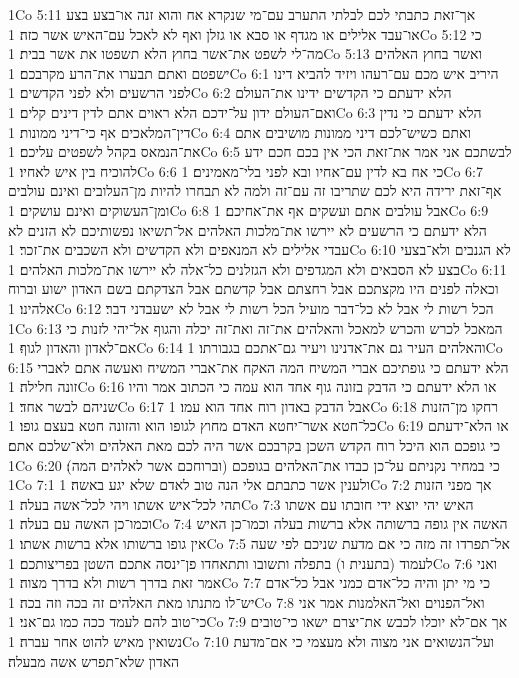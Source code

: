1Co 5:11  אך־זאת כתבתי לכם לבלתי התערב עם־מי שנקרא אח והוא זנה או־בצע בצע או־עבד אלילים או מגדף או סבא או גזלן ואף לא לאכל עם־האיש אשר כזה׃
1Co 5:12  כי מה־לי לשפט את־אשר בחוץ הלא תשפטו את אשר בבית׃
1Co 5:13  ואשר בחוץ האלהים ישפטם ואתם תבערו את־הרע מקרבכם׃
1Co 6:1  היריב איש מכם עם־רעהו ויזיד להביא דינו לפני הרשעים ולא לפני הקדשים׃
1Co 6:2  הלא ידעתם כי הקדשים ידינו את־העולם ואם־העולם ידון על־ידכם הלא ראוים אתם לדין דינים קלים׃
1Co 6:3  הלא ידעתם כי נדין דין־המלאכים אף כי־דיני ממונות׃
1Co 6:4  ואתם כשיש־לכם דיני ממונות מושיבים אתם את־הנמאס בקהל לשפטים עליכם׃
1Co 6:5  לבשתכם אני אמר את־זאת הכי אין בכם חכם ידע להוכיח בין איש לאחיו׃
1Co 6:6  כי אח בא לדין עם־אחיו ובא לפני בלי־מאמינים׃
1Co 6:7  אף־זאת ירידה היא לכם שתריבו זה עם־זה ולמה לא תבחרו להיות מן־העלובים ואינם עולבים ומן־העשוקים ואינם עושקים׃
1Co 6:8  אבל עולבים אתם ועשקים אף את־אחיכם׃
1Co 6:9  הלא ידעתם כי הרשעים לא יירשו את־מלכות האלהים אל־תשיאו נפשותיכם לא הזנים לא עבדי אלילים לא המנאפים ולא הקדשים ולא השכבים את־זכר׃
1Co 6:10  לא הגנבים ולא־בצעי בצע לא הסבאים ולא המגדפים ולא הגזלנים כל־אלה לא יירשו את־מלכות האלהים׃
1Co 6:11  וכאלה לפנים היו מקצתכם אבל רחצתם אבל קדשתם אבל הצדקתם בשם האדון ישוע וברוח אלהינו׃
1Co 6:12  הכל רשות לי אבל לא כל־דבר מועיל הכל רשות לי אבל לא ישעבדני דבר׃
1Co 6:13  המאכל לכרש והכרש למאכל והאלהים את־זה ואת־זה יכלה והגוף אל־יהי לזנות כי אם־לאדון והאדון לגוף׃
1Co 6:14  והאלהים העיר גם את־אדנינו ויעיר גם־אתכם בגבורתו׃
1Co 6:15  הלא ידעתם כי גופתיכם אברי המשיח המה האקח את־אברי המשיח ואעשה אתם לאברי זונה חלילה׃
1Co 6:16  או הלא ידעתם כי הדבק בזונה גוף אחד הוא עמה כי הכתוב אמר והיו שניהם לבשר אחד׃
1Co 6:17  אבל הדבק באדון רוח אחד הוא עמו׃
1Co 6:18  רחקו מן־הזנות כל־חטא אשר־יחטא האדם מחוץ לגופו הוא והזונה חטא בעצם גופו׃
1Co 6:19  או הלא־ידעתם כי גופכם הוא היכל רוח הקדש השכן בקרבכם אשר היה לכם מאת האלהים ולא־שלכם אתם׃
1Co 6:20  כי במחיר נקניתם על־כן כבדו את־האלהים בגופכם (וברוחכם אשר לאלהים המה)׃
1Co 7:1  ולענין אשר כתבתם אלי הנה טוב לאדם שלא יגע באשה׃
1Co 7:2  אך מפני הזנות תהי לכל־איש אשתו ויהי לכל־אשה בעלה׃
1Co 7:3  האיש יהי יוצא ידי חובתו עם אשתו וכמו־כן האשה עם בעלה׃
1Co 7:4  האשה אין גופה ברשותה אלא ברשות בעלה וכמו־כן האיש אין גופו ברשותו אלא ברשות אשתו׃
1Co 7:5  אל־תפרדו זה מזה כי אם מדעת שניכם לפי שעה לעמוד (בתענית ו) בתפלה ותשובו ותתאחדו פן־ינסה אתכם השטן בפריצותכם׃
1Co 7:6  ואני אמר זאת בדרך רשות ולא בדרך מצוה׃
1Co 7:7  כי מי יתן והיה כל־אדם כמני אבל כל־אדם יש־לו מתנתו מאת האלהים זה בכה וזה בכה׃
1Co 7:8  ואל־הפנוים ואל־האלמנות אמר אני כי־טוב להם לעמד ככה כמו גם־אני׃
1Co 7:9  אך אם־לא יוכלו לכבש את־יצרם ישאו כי־טובים נשואין מאיש להוט אחר עברה׃
1Co 7:10  ועל־הנשואים אני מצוה ולא מעצמי כי אם־מדעת האדון שלא־תפרש אשה מבעלה׃
